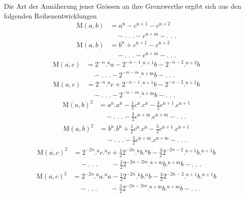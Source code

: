 \par Die Art der Annäherung jener Grössen an ihre Grenzwerthe ergibt sich aus den folgenden Reihenentwicklungen
\[
\begin{aligned}\mathrm{M}(a,b)&=a^{\mathrm{n}}-c^{\mathrm{n}+1}-c^{\mathrm{n}+2}\\&\quad-.\;.\;.-c^{\mathrm{n}+\mathrm{m}}-.\;.\;.\end{aligned}
\]
\[
\begin{aligned}\mathrm{M}(a,b)&=b^{\mathrm{n}}+c^{\mathrm{n}+1}-c^{\mathrm{n}+2}\\&\quad-.\;.\;.-c^{\mathrm{n}+\mathrm{m}}-.\;.\;.\end{aligned}
\]
\[
\begin{aligned}\mathrm{M}(a,c)&=2^{-n}.{}^{\mathrm{n}}a-2^{-n-1}.{}^{\mathrm{n}+1}b-2^{-n-2}.{}^{\mathrm{n}+2}b\\&\quad-.\;.\;.-2^{-n-m}.{}^{\mathrm{n}+\mathrm{m}}b-.\;.\;.\end{aligned}
\]
\[
\begin{aligned}\mathrm{M}(a,c)&=2^{-n}.{}^{\mathrm{n}}c+2^{-n-1}.{}^{\mathrm{n}+1}b-2^{-n-2}.{}^{\mathrm{n}+2}b\\&\quad-.\;.\;.-2^{-n-m}.{}^{\mathrm{n}+\mathrm{m}}b-.\;.\;.\end{aligned}
\]
\[
\begin{aligned}\mathrm{M}(a,b)^2&=a^{\mathrm{n}}.a^{\mathrm{n}}-\frac12c^{\mathrm{n}}.c^{\mathrm{n}}-\frac32c^{\mathrm{n}+1}.c^{\mathrm{n}+1}\\&\quad-.\;.\;.-\frac32c^{\mathrm{n}+\mathrm{m}}.c^{\mathrm{n}+\mathrm{m}}-.\;.\;.\end{aligned}
\]
\[
\begin{aligned}\mathrm{M}(a,b)^2&=b^{\mathrm{n}}.b^{\mathrm{n}}+\frac12c^{\mathrm{n}}.c^{\mathrm{n}}-\frac32c^{\mathrm{n}+1}.c^{\mathrm{n}+1}\\&\quad-.\;.\;.-\frac32c^{\mathrm{n}+\mathrm{m}}.c^{\mathrm{n}+\mathrm{m}}-.\;.\;.\end{aligned}
\]
\[
\begin{aligned}\mathrm{M}(a,c)^2&=2^{-2n}.{}^{\mathrm{n}}c.{}^{\mathrm{n}}c+\frac12 2^{-2n}.{}^{\mathrm{n}}b.{}^{\mathrm{n}}b-\frac32 2^{-2n-2}.{}^{\mathrm{n}+1}b.{}^{\mathrm{n}+1}b\\&\quad-.\;.\;.\qquad-\frac32 2^{-2n-2m}.{}^{\mathrm{n}+\mathrm{m}}b.{}^{\mathrm{n}+\mathrm{m}}b-.\;.\;.\end{aligned}
\]
\[
\begin{aligned}\mathrm{M}(a,c)^2&=2^{-2n}.{}^{\mathrm{n}}a.{}^{\mathrm{n}}a-\frac12 2^{-2n}.{}^{\mathrm{n}}b.{}^{\mathrm{n}}b-\frac32 2^{-2n-2}.{}^{\mathrm{n}+1}b.{}^{\mathrm{n}+1}b\\&\quad-.\;.\;.\qquad-\frac32 2^{-2n-2m}.{}^{\mathrm{n}+\mathrm{m}}b.{}^{\mathrm{n}+\mathrm{m}}b-.\;.\;.\end{aligned}
\]
